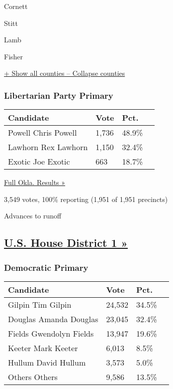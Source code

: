  Cornett

 Stitt

 Lamb

 Fisher

\protect\hyperlink{}{+ Show all counties -- Collapse counties}

\hypertarget{libertarian-party-primary}{%
\subsubsection{Libertarian Party
Primary}\label{libertarian-party-primary}}

\begin{longtable}[]{@{}llll@{}}
\toprule
Candidate & Vote & Pct. &\tabularnewline
\midrule
\endhead
 Powell Chris Powell & 1,736 & 48.9\% &\tabularnewline
 Lawhorn Rex Lawhorn & 1,150 & 32.4\% &\tabularnewline
 Exotic Joe Exotic & 663 & 18.7\% &\tabularnewline
\bottomrule
\end{longtable}

\href{https://www.nytimes3xbfgragh.onion/elections/results/oklahoma}{Full
Okla. Results »}

3,549 votes, 100\% reporting (1,951 of 1,951 precincts)

 Advances to runoff

\hypertarget{us-house-district-1-}{%
\subsection{\texorpdfstring{\href{https://www.nytimes3xbfgragh.onion/elections/results/oklahoma-house-district-1-primary-election}{U.S.
House District 1
»}}{U.S. House District 1 »}}\label{us-house-district-1-}}

\hypertarget{democratic-primary-1}{%
\subsubsection{Democratic Primary}\label{democratic-primary-1}}

\begin{longtable}[]{@{}llll@{}}
\toprule
Candidate & Vote & Pct. &\tabularnewline
\midrule
\endhead
 Gilpin Tim Gilpin & 24,532 & 34.5\% &\tabularnewline
 Douglas Amanda Douglas & 23,045 & 32.4\% &\tabularnewline
 Fields Gwendolyn Fields & 13,947 & 19.6\% &\tabularnewline
 Keeter Mark Keeter & 6,013 & 8.5\% &\tabularnewline
 Hullum David Hullum & 3,573 & 5.0\% &\tabularnewline
 Others Others & 9,586 & 13.5\% &\tabularnewline
\bottomrule
\end{longtable}

